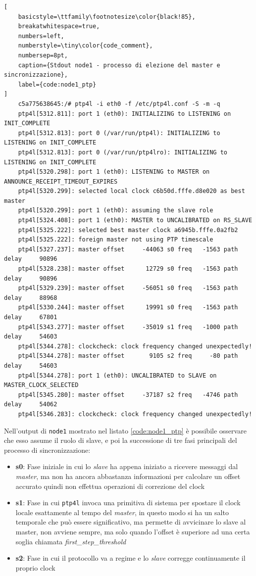 \documentclass[12pt,a4paper,twoside]{book}
\begin{document}
\begin{onehalfspace}
\begin{lstlisting}[
    basicstyle=\ttfamily\footnotesize\color{black!85},
    breakatwhitespace=true,
    numbers=left,
    numberstyle=\tiny\color{code_comment},
    numbersep=8pt,
    caption={Stdout node1 - processo di elezione del master e sincronizzazione},
    label={code:node1_ptp}
]
    c5a775638645:/# ptp4l -i eth0 -f /etc/ptp4l.conf -S -m -q
    ptp4l[5312.811]: port 1 (eth0): INITIALIZING to LISTENING on INIT_COMPLETE
    ptp4l[5312.813]: port 0 (/var/run/ptp4l): INITIALIZING to LISTENING on INIT_COMPLETE
    ptp4l[5312.813]: port 0 (/var/run/ptp4lro): INITIALIZING to LISTENING on INIT_COMPLETE
    ptp4l[5320.298]: port 1 (eth0): LISTENING to MASTER on ANNOUNCE_RECEIPT_TIMEOUT_EXPIRES
    ptp4l[5320.299]: selected local clock c6b50d.fffe.d8e020 as best master
    ptp4l[5320.299]: port 1 (eth0): assuming the slave role
    ptp4l[5324.408]: port 1 (eth0): MASTER to UNCALIBRATED on RS_SLAVE
    ptp4l[5325.222]: selected best master clock a6945b.fffe.0a2fb2
    ptp4l[5325.222]: foreign master not using PTP timescale
    ptp4l[5327.237]: master offset     -44063 s0 freq   -1563 path delay     90896
    ptp4l[5328.238]: master offset      12729 s0 freq   -1563 path delay     90896
    ptp4l[5329.239]: master offset     -56051 s0 freq   -1563 path delay     88968
    ptp4l[5330.244]: master offset      19991 s0 freq   -1563 path delay     67801
    ptp4l[5343.277]: master offset     -35019 s1 freq   -1000 path delay     54603
    ptp4l[5344.278]: clockcheck: clock frequency changed unexpectedly!
    ptp4l[5344.278]: master offset       9105 s2 freq     -80 path delay     54603
    ptp4l[5344.278]: port 1 (eth0): UNCALIBRATED to SLAVE on MASTER_CLOCK_SELECTED
    ptp4l[5345.280]: master offset     -37187 s2 freq   -4746 path delay     54062
    ptp4l[5346.283]: clockcheck: clock frequency changed unexpectedly!
\end{lstlisting}

Nell'output di \texttt{node1} mostrato nel listato \ref{code:node1_ptp} è possibile osservare che esso assume il ruolo di slave, e poi la successione di tre fasi principali del processo di sincronizzazione:
\begin{itemize}
    \item \textbf{s0}: Fase iniziale in cui lo \textit{slave} ha appena iniziato a ricevere messaggi dal \textit{master}, ma non ha ancora abbastanza informazioni per calcolare un offset accurato quindi non effettua operazioni di correzione del clock
    \item \textbf{s1}: Fase in cui \texttt{ptp4l} invoca una primitiva di sistema per spostare il clock locale esattamente al tempo del \textit{master}, in questo modo si ha un salto temporale che può essere significativo, ma permette di avvicinare lo slave al master, non avviene sempre, ma solo quando l'offset è superiore ad una certa soglia chiamata \textit{first\_step\_threshold}
    \item \textbf{s2}: Fase in cui il protocollo va a regime e lo \textit{slave} corregge continuamente il proprio clock
\end{itemize}

\end{onehalfspace}
\end{document}
